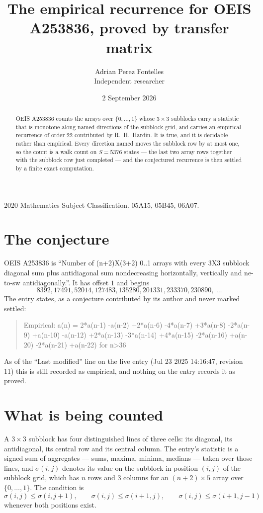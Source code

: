 \documentclass[11pt,a4paper]{article}
\title{The empirical recurrence for OEIS A253836, proved by transfer matrix}
\author{Adrian Perez Fontelles\\ \small Independent researcher}
\date{2 September 2026}
\theoremstyle{plain}
\theoremstyle{definition}
\begin{document}
\maketitle

\begin{abstract}
OEIS A253836 counts the arrays over $\{0,\dots,1\}$ whose $3\times3$ subblocks carry a
statistic that is monotone along named directions of the subblock grid, and carries an
empirical recurrence of order $22$ contributed by R.~H.~Hardin. It is true, and it is
decidable rather than empirical. Every direction named moves the subblock row by at most one,
so the count is a walk count on $S=5376$ states --- the last two array rows together with the
subblock row just completed --- and the conjectured recurrence is then settled by a finite
exact computation.
\end{abstract}

\noindent\small 2020 Mathematics Subject Classification. 05A15, 05B45, 06A07.\normalsize

\section{The conjecture}

OEIS A253836 is ``Number of (n+2)X(3+2) 0..1 arrays with every 3X3 subblock diagonal sum plus antidiagonal sum nondecreasing horizontally, vertically and ne-to-sw antidiagonally.''. It has offset $1$ and begins
\[
8392, 17491, 52014, 127483, 135280, 201331, 233370, 230890,\ \dots
\]
The entry states, as a conjecture contributed by its author and never marked settled:
\begin{quote}
Empirical: a(n) = 2*a(n-1) -a(n-2) +2*a(n-6) -4*a(n-7) +3*a(n-8) -2*a(n-9) +a(n-10) -a(n-12) +2*a(n-13) -3*a(n-14) +4*a(n-15) -2*a(n-16) +a(n-20) -2*a(n-21) +a(n-22) for n>36
\end{quote}
As of the ``Last modified'' line on the live entry (Jul 23 2025 14:16:47, revision 11) this is still
recorded as empirical, and nothing on the entry records it as proved.

\section{What is being counted}

A $3\times3$ subblock has four distinguished lines of three cells: its diagonal, its
antidiagonal, its central row and its central column. The entry's statistic is a signed sum of
aggregates --- sums, maxima, minima, medians --- taken over those lines, and $\sigma(i,j)$
denotes its value on the subblock in position $(i,j)$ of the subblock grid, which has $n$ rows
and $3$ columns for an $(n+2)\times5$ array over $\{0,\dots,1\}$. The condition is
\[
\sigma(i,j)\le\sigma(i,j+1),\qquad \sigma(i,j)\le\sigma(i+1,j),\qquad \sigma(i,j)\le\sigma(i+1,j-1)
\]
whenever both positions exist.
\end{document}
